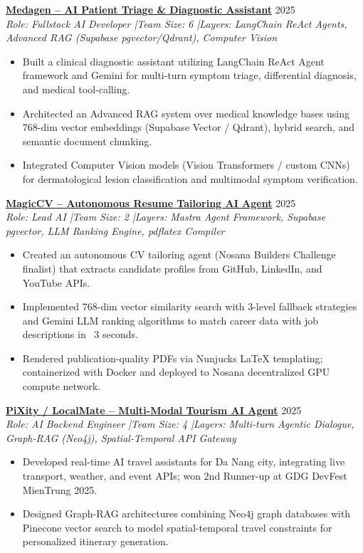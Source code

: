 \documentclass[10pt,a4paper]{article}
\begin{document}
\vspace{0.4em}
\href{https://github.com/nxc1802/Medagen}{\textbf{Medagen -- AI Patient Triage \& Diagnostic Assistant}} \hfill 2025 \\
\emph{Role: Fullstack AI Developer \quad|\quad Team Size: 6 \quad|\quad Layers: LangChain ReAct Agents, Advanced RAG (Supabase pgvector/Qdrant), Computer Vision}
\begin{itemize}
\item Built a clinical diagnostic assistant utilizing LangChain ReAct Agent framework and Gemini for multi-turn symptom triage, differential diagnosis, and medical tool-calling.
\item Architected an Advanced RAG system over medical knowledge bases using 768-dim vector embeddings (Supabase Vector / Qdrant), hybrid search, and semantic document chunking.
\item Integrated Computer Vision models (Vision Transformers / custom CNNs) for dermatological lesion classification and multimodal symptom verification.
\end{itemize}

\vspace{0.4em}
\href{https://github.com/nxc1802/MagiCV}{\textbf{MagicCV -- Autonomous Resume Tailoring AI Agent}} \hfill 2025 \\
\emph{Role: Lead AI \quad|\quad Team Size: 2 \quad|\quad Layers: Mastra Agent Framework, Supabase pgvector, LLM Ranking Engine, pdflatex Compiler}
\begin{itemize}
\item Created an autonomous CV tailoring agent (Nosana Builders Challenge finalist) that extracts candidate profiles from GitHub, LinkedIn, and YouTube APIs.
\item Implemented 768-dim vector similarity search with 3-level fallback strategies and Gemini LLM ranking algorithms to match career data with job descriptions in ~3 seconds.
\item Rendered publication-quality PDFs via Nunjucks LaTeX templating; containerized with Docker and deployed to Nosana decentralized GPU compute network.
\end{itemize}

\vspace{0.4em}
\href{https://github.com/zok213/PixAgent_webbase}{\textbf{PiXity / LocalMate -- Multi-Modal Tourism AI Agent}} \hfill 2025 \\
\emph{Role: AI Backend Engineer \quad|\quad Team Size: 4 \quad|\quad Layers: Multi-turn Agentic Dialogue, Graph-RAG (Neo4j), Spatial-Temporal API Gateway}
\begin{itemize}
\item Developed real-time AI travel assistants for Da Nang city, integrating live transport, weather, and event APIs; won 2nd Runner-up at GDG DevFest MienTrung 2025.
\item Designed Graph-RAG architectures combining Neo4j graph databases with Pinecone vector search to model spatial-temporal travel constraints for personalized itinerary generation.
\end{itemize}
\end{document}
